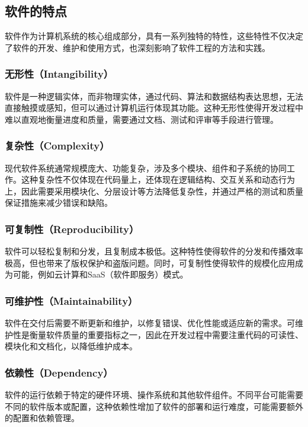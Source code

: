 \subsection{软件的特点}

软件作为计算机系统的核心组成部分，具有一系列独特的特性，这些特性不仅决定了软件的开发、维护和使用方式，也深刻影响了软件工程的方法和实践。

\subsubsection{无形性（Intangibility）}

软件是一种逻辑实体，而非物理实体，通过代码、算法和数据结构表达思想，无法直接触摸或感知，但可以通过计算机运行体现其功能。这种无形性使得开发过程中难以直观地衡量进度和质量，需要通过文档、测试和评审等手段进行管理。

\subsubsection{复杂性（Complexity）}

现代软件系统通常规模庞大、功能复杂，涉及多个模块、组件和子系统的协同工作。这种复杂性不仅体现在代码量上，还体现在逻辑结构、交互关系和动态行为上，因此需要采用模块化、分层设计等方法降低复杂性，并通过严格的测试和质量保证措施来减少错误和缺陷。

\subsubsection{可复制性（Reproducibility）}

软件可以轻松复制和分发，且复制成本极低。这种特性使得软件的分发和传播效率极高，但也带来了版权保护和盗版问题。同时，可复制性使得软件的规模化应用成为可能，例如云计算和SaaS（软件即服务）模式。

\subsubsection{可维护性（Maintainability）}

软件在交付后需要不断更新和维护，以修复错误、优化性能或适应新的需求。可维护性是衡量软件质量的重要指标之一，因此在开发过程中需要注重代码的可读性、模块化和文档化，以降低维护成本。

\subsubsection{依赖性（Dependency）}

软件的运行依赖于特定的硬件环境、操作系统和其他软件组件。不同平台可能需要不同的软件版本或配置，这种依赖性增加了软件的部署和运行难度，可能需要额外的配置和依赖管理。

